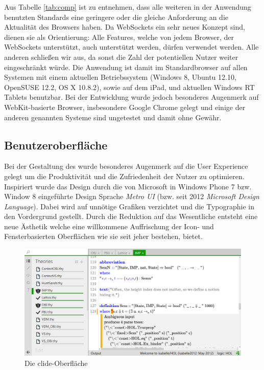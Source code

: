 
Aus Tabelle \ref{tab:comp} ist zu entnehmen, dass alle weiteren in der Anwendung benutzten Standards
eine geringere oder die gleiche Anforderung an die Aktualität des Browsers haben. Da WebSockets ein
sehr neues Konzept sind,  dienen sie als Orientierung: Alle Features, welche von jedem Browser, der
WebSockets unterstützt, auch unterstützt werden, dürfen verwendet werden. Alle anderen schließen wir
aus, da sonst die Zahl der potentiellen Nutzer weiter eingeschränkt würde. Die Anwendung ist damit
im Standardbrowser auf allen Systemen mit einem aktuellen Betriebssystem (Windows 8, Ubuntu 12.10,
OpenSUSE 12.2, OS X 10.8.2), sowie auf dem iPad, und aktuellen Windows RT Tablets benutzbar. Bei der
Entwicklung wurde jedoch besonderes Augenmerk auf WebKit-basierte Browser, insbesondere Google
Chrome gelegt und einige der anderen genannten Systeme sind ungetestet und damit ohne Gewähr.

\subsection{Benutzeroberfläche}

Bei der Gestaltung des  wurde besonderes Augenmerk auf die User Experience gelegt
um die Produktivität und die Zufriedenheit der Nutzer zu optimieren. \cite{emotionaldesign}
Inspiriert wurde das Design durch die von Microsoft in Windows Phone 7 bzw. Window 8 eingeführte
Design Sprache \textit{Metro UI} (bzw. seit 2012 \textit{Microsoft Design Language}). \cite{metroui}
Dabei wird auf unnötige Grafiken verzichtet und die Typographie in den Vordergrund gestellt. Durch
die Reduktion auf das Wesentliche entsteht eine neue Ästhetik welche eine willkommene Auffrischung
der Icon- und Fensterbasierten Oberflächen wie sie seit jeher bestehen, bietet.

\begin{figure}[ht]
\includegraphics[width=\linewidth]{images/screen-main}
  \caption{Die clide-Oberfläche}
  \label{fig:screen-main}
\end{figure}

